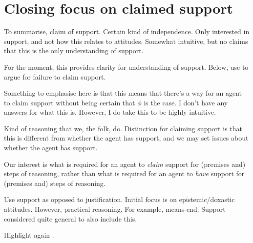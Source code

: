 



\section{Closing focus on claimed support}

\begin{note}
  To summarise, claim of support.
  Certain kind of independence.
  Only interested in support, and not how this relates to attitudes.
  Somewhat intuitive, but no claims that this is the only understanding of support.

  For the moment, this provides clarity for understanding of support.
  Below, use to argue for failure to claim support.
\end{note}

\begin{note}
  \color{red}
  Something to emphasise here is that this means that there's a way for an agent to claim support without being certain that \(\phi\) is the case.
  I don't have any answers for what this is.
  However, I do take this to be highly intuitive.
\end{note}


\begin{note}[Adequate]
  Kind of reasoning that we, the folk, do.
  Distinction for claiming support is that this is different from whether the agent has support, and we may set issues about whether the agent has support.

  Our interest is what is required for an agent to \emph{claim} support for (premises and) steps of reasoning, rather than what is required for an agent to \emph{have} support for (premises and) steps of reasoning.

  Use support as opposed to justification.
  Initial focus is on epistemic/doxastic attitudes.
  However, practical reasoning.
  For example, means-end.
  Support considered quite general to also include this.
\end{note}

\begin{note}
  Highlight again .
\end{note}

